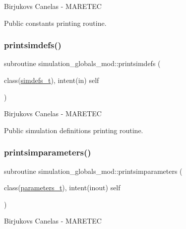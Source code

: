 Birjukovs Canelas -\/ M\+A\+R\+E\+T\+EC 

Public constants printing routine. \mbox{\label{namespacesimulation__globals__mod_ad331ccf019de7ed531e37c655600f90f}} 
\subsubsection{\texorpdfstring{printsimdefs()}{printsimdefs()}}
{\footnotesize\ttfamily subroutine simulation\+\_\+globals\+\_\+mod\+::printsimdefs (\begin{DoxyParamCaption}\item[{class(\hyperlink{structsimulation__globals__mod_1_1simdefs__t}{simdefs\+\_\+t}), intent(in)}]{self }\end{DoxyParamCaption})\hspace{0.3cm}{\ttfamily [private]}}



Birjukovs Canelas -\/ M\+A\+R\+E\+T\+EC 

Public simulation definitions printing routine. \mbox{\label{namespacesimulation__globals__mod_a97c04d0289a9f2d004a9329cb7ab16f0}} 
\subsubsection{\texorpdfstring{printsimparameters()}{printsimparameters()}}
{\footnotesize\ttfamily subroutine simulation\+\_\+globals\+\_\+mod\+::printsimparameters (\begin{DoxyParamCaption}\item[{class(\hyperlink{structsimulation__globals__mod_1_1parameters__t}{parameters\+\_\+t}), intent(inout)}]{self }\end{DoxyParamCaption})\hspace{0.3cm}{\ttfamily [private]}}



Birjukovs Canelas -\/ M\+A\+R\+E\+T\+EC 

